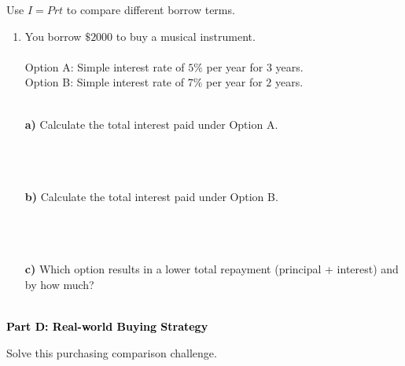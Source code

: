 \documentclass[12pt, letterpaper, fleqn]{article}
\begin{document}
\vspace{3mm}

\noindent
Use $I = Prt$ to compare different borrow terms.

\vspace{5mm}

\begin{enumerate}[itemsep=2.5cm, leftmargin=0.6cm]
\item You borrow $\$2000$ to buy a musical instrument. \\ \\
Option A: Simple interest rate of $5\%$ per year for $3$ years. \\
Option B: Simple interest rate of $7\%$ per year for $2$ years. \\ \\
\vspace{0.5cm}

\textbf{a)} Calculate the total interest paid under Option A. \\ \\
 \\ \\
\vspace{1.2cm}

\textbf{b)} Calculate the total interest paid under Option B. \\ \\
 \\ \\
\vspace{1.2cm}

\textbf{c)} Which option results in a lower total repayment (principal + interest) and by how much? \\ \\


\end{enumerate}

\newpage

\begin{tcolorbox}[colback=black!10]
    \large\textcolor{black}{\textbf{Part D: Real-world Buying Strategy}}
\end{tcolorbox}

\vspace{3mm}

\noindent
Solve this purchasing comparison challenge.

\vspace{5mm}
\end{document}
